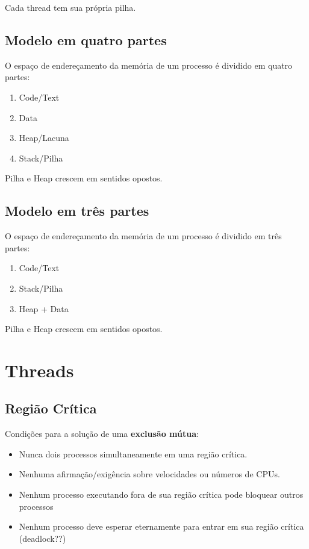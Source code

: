 \documentclass[ ]{article}
\begin{document}
			Cada thread tem  sua própria pilha.
			
		\subsection{Modelo em quatro partes}
		O espaço de endereçamento da memória de um processo é dividido em quatro partes:
			\begin{enumerate}
				\item Code/Text
				\item Data
				\item Heap/Lacuna
				\item Stack/Pilha
			\end{enumerate}
			
		Pilha e Heap crescem em sentidos opostos.
		\subsection{Modelo em três partes}
		O espaço de endereçamento da memória de um processo é dividido em três partes:
			\begin{enumerate}
				\item Code/Text
				\item Stack/Pilha
				\item Heap + Data
			\end{enumerate}
			
		Pilha e Heap crescem em sentidos opostos.
	\section{Threads}
		\subsection{Região Crítica}
		
		Condições para a solução de uma \textbf{exclusão mútua}:
		\begin{itemize}
			\item Nunca dois processos simultaneamente em uma
região crítica.
			\item Nenhuma afirmação/exigência sobre
velocidades ou números de CPUs.
			\item Nenhum processo executando fora de sua
região crítica pode bloquear outros processos
			\item Nenhum processo deve esperar eternamente
para entrar em sua região crítica (deadlock??)
		\end{itemize}
		
\end{document}
